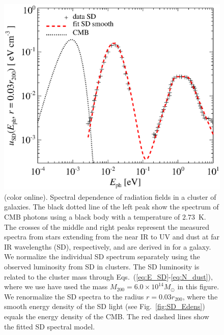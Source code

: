 \documentclass[10pt,aps,pra,reprint,amsmath,amsfonts,amssymb,showpacs,nofootinbib,floatfix]{revtex4-1}
\newcommand{\msun}{M_\odot}
\newcommand{\colo}{(color online). }
\newcommand{\rvir}{r_{200}}
\newcommand{\mvir}{M_{200}}
\begin{document}
\begin{figure}%
 \includegraphics[width=0.99\columnwidth]{figures/fit.porter.v2.eps}
 \caption{\colo Spectral dependence of radiation fields
   in a cluster of galaxies. The black dotted line of the left peak
   show the spectrum of CMB photons using a black body with a
   temperature of $2.73$~K. The crosses of the middle and right peaks
   represent the measured spectra from stars extending from the near
   IR to UV and dust at far IR wavelengths (SD), respectively, and are
   derived in \protect \cite{2006ApJ...648L..29P} for a galaxy. We
   normalize the individual SD spectrum separately using the observed
   luminosity from SD in clusters. The SD luminosity is related to the
   cluster mass through Eqs.~(\ref{eq:E_SD}-\ref{eq:N_dust}), where we
   use have used the mass $\mvir=6.0\times10^{14}\msun$ in this
   figure. We renormalize the SD spectra to the radius $r=0.03\rvir$,
   where the smooth energy density of the SD light (see
   Fig.~\ref{fig:SD_Edens}) equals the energy density of the CMB. The
   red dashed lines show the fitted SD spectral model.}
 \label{fig:SD_spectra}
\end{figure}
\end{document}
